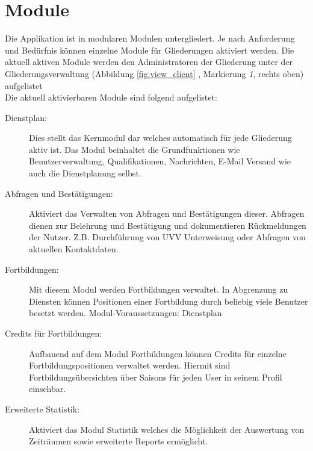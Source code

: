 \chapter{Module}
\label{cha:module}
Die Applikation ist in modularen Modulen untergliedert. Je nach Anforderung und Bedürfnis können einzelne Module für Gliederungen aktiviert werden.
Die aktuell aktiven Module werden den Administratoren der Gliederung unter der Gliederungsverwaltung \noindent (Abbildung \ref{fig:view_client} \textit{}, Markierung \textit{1}, rechts oben) aufgelistet\\

\noindent Die aktuell aktivierbaren Module sind folgend aufgelistet:

\begin{description}
	\item[Dienstplan:] Dies stellt das Kernmodul dar welches automatisch für jede Gliederung aktiv ist. Das Modul beinhaltet die Grundfunktionen wie Benutzerverwaltung, Qualifikationen, Nachrichten, E-Mail Versand wie auch die Dienstplanung selbst.

    \item[Abfragen und Bestätigungen:] Aktiviert das Verwalten von Abfragen und Bestätigungen dieser. Abfragen dienen zur Belehrung und Bestätigung und dokumentieren Rückmeldungen der Nutzer. Z.B. Durchführung von UVV Unterweisung oder Abfragen von aktuellen Kontaktdaten.

	\item[Fortbildungen:] Mit diesem Modul werden Fortbildungen verwaltet.
	In Abgrenzung zu Diensten können Positionen einer Fortbildung durch beliebig viele Benutzer besetzt werden. 
	Modul-Voraussetzungen: Dienstplan

    \item[Credits für Fortbildungen:] Aufbauend auf dem Modul Fortbildungen können Credits für einzelne Fortbildungspositionen verwaltet werden. Hiermit sind Fortbildungsübersichten über Saisons für jeden User in seinem Profil einsehbar.

    \item[Erweiterte Statistik:] Aktiviert das Modul Statistik welches die Möglichkeit der Auswertung von Zeiträumen sowie erweiterte Reports ermöglicht.

\end{description}
